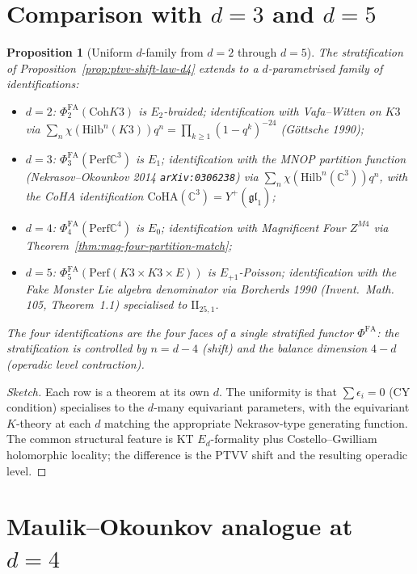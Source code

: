 \documentclass[11pt]{article}
\providecommand{\C}{\mathbb{C}}
\providecommand{\fgl}{\mathfrak{gl}}
\providecommand{\Perf}{\mathrm{Perf}}
\providecommand{\Coh}{\mathrm{Coh}}
\providecommand{\Hilb}{\mathrm{Hilb}}
\providecommand{\Eone}{E_1}
\providecommand{\Ezero}{E_0}
\providecommand{\PhiFA}{\Phi^{\mathrm{FA}}}
\newtheorem{proposition}[theorem]{Proposition}
\theoremstyle{definition}
\begin{document}
\section{Comparison with $d = 3$ and $d = 5$}
\label{sec:dim-comparison}

\begin{proposition}[Uniform $d$-family from $d = 2$ through $d = 5$]
\label{prop:uniform-d-family}
The stratification of Proposition~\ref{prop:ptvv-shift-law-d4} extends
to a $d$-parametrised family of identifications:
\begin{itemize}[leftmargin=2em]
  \item $d = 2$: $\PhiFA_2(\Coh K3)$ is $E_2$-braided;
  identification with Vafa--Witten on $K3$ via
  $\sum_n \chi(\Hilb^n(K3)) q^n = \prod_{k \geq 1} (1 - q^k)^{-24}$
  (G\"ottsche 1990);
  \item $d = 3$: $\PhiFA_3(\Perf \C^3)$ is $\Eone$;
  identification with the MNOP partition function
  (Nekrasov--Okounkov 2014 \texttt{arXiv:0306238}) via
  $\sum_n \chi(\Hilb^n(\C^3)) q^n$, with the CoHA identification
  $\mathrm{CoHA}(\C^3) = Y^+(\widehat{\fgl}_1)$;
  \item $d = 4$: $\PhiFA_4(\Perf \C^4)$ is $\Ezero$;
  identification with Magnificent Four $Z^{M4}$ via
  Theorem~\ref{thm:mag-four-partition-match};
  \item $d = 5$: $\PhiFA_5(\Perf(K3 \times K3 \times E))$ is
  $E_{+1}$-Poisson; identification with the Fake Monster
  Lie algebra denominator via Borcherds 1990
  (\emph{Invent.\ Math.} 105, Theorem~1.1) specialised to
  $\mathrm{II}_{25,1}$.
\end{itemize}
The four identifications are the four faces of a single
stratified functor $\PhiFA$: the stratification is controlled by
$n = d - 4$ (shift) and the balance dimension $4 - d$ (operadic
level contraction).
\end{proposition}

\begin{proof}[Sketch]
Each row is a theorem at its own $d$. The uniformity is that
$\sum \epsilon_i = 0$ (CY condition) specialises to the
$d$-many equivariant parameters, with the equivariant $K$-theory
at each $d$ matching the appropriate Nekrasov-type generating
function. The common structural feature is KT $E_d$-formality
plus Costello--Gwilliam holomorphic locality; the difference is
the PTVV shift and the resulting operadic level.
\end{proof}

\section{Maulik--Okounkov analogue at $d = 4$}
\label{sec:mo-analogue-d4}
\end{document}
